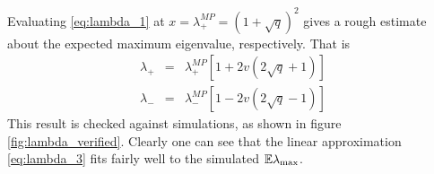 \documentclass{article}
\begin{document}
Evaluating \eqref{eq:lambda_1} at $x = \lambda^{MP}_{+} = (1 +
\sqrt{q})^2$ gives a rough estimate about the expected maximum
eigenvalue, respectively. That is
\begin{eqnarray}
  \lambda_{+} &=& \lambda_{+}^{MP} [1+2v(2\sqrt q +
  1)] \label{eq:lambda_3} \\
  \lambda_{-} &=& \lambda_{-}^{MP} [1-2v(2\sqrt q -
  1)] \label{eq:lambda_4}
\end{eqnarray}
This result is checked against simulations, as shown in figure
\ref{fig:lambda_verified}. Clearly one can see that the linear
approximation \eqref{eq:lambda_3} fits fairly well to the simulated
$\mathbb{E} \lambda_{\text{max}}$.
\begin{figure}[htb!]
  \centering
\end{figure}
\end{document}

